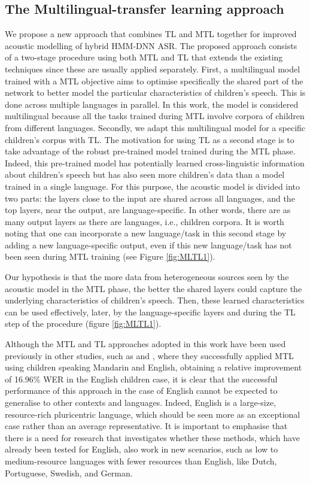 \subsection{The Multilingual-transfer learning approach}
\label{section:method}

We propose a new approach that combines \ac{TL} and \ac{MTL} together for improved acoustic modelling of hybrid \ac{HMM-DNN} \ac{ASR}. The proposed approach consists of a two-stage procedure using both \ac{MTL} and \ac{TL} that extends the existing techniques since these are usually applied separately. First, a multilingual model trained with a \ac{MTL} objective aims to optimise specifically the shared part of the network to better model the particular characteristics of children's speech. This is done across multiple languages in parallel. In this work, the model is considered multilingual because all the tasks trained during \ac{MTL} involve corpora of children from different languages.
Secondly, we adapt this multilingual model for a specific children's corpus with \ac{TL}. The motivation for using \ac{TL} as a second stage is to take advantage of the robust pre-trained model trained during the \ac{MTL} phase. Indeed, this pre-trained model has potentially learned cross-linguistic information about children's speech but has also seen more children's data than a model trained in a single language. 
For this purpose, the acoustic model is divided into two parts: the layers close to the input are shared across all languages, and the top layers, near the output, are language-specific. In other words, there are as many output layers as there are languages, i.e., children corpora. It is worth noting that one can incorporate a new language/task in this second stage by adding a new language-specific output, even if this new language/task has not been seen during \ac{MTL} training (see Figure \ref{fig:MLTL1}).

Our hypothesis is that the more data from heterogeneous sources seen by the acoustic model in the \ac{MTL} phase, the better the shared layers could capture the underlying characteristics of children's speech. Then, these learned characteristics can be used effectively, later, by the language-specific layers and during the \ac{TL} step of the procedure (figure \ref{fig:MLTL1}). 

Although the \ac{MTL} and \ac{TL} approaches adopted in this work have been used previously in other studies, such as \cite{TransferLF} and \cite{2019multi}, where they successfully applied \ac{MTL} using children speaking Mandarin and English, obtaining a relative improvement of 16.96\% \ac{WER} in the English children case, it is clear that the successful performance of this approach in the case of English cannot be expected to generalise to other contexts and languages. Indeed, English is a large-size, resource-rich pluricentric language, which should be seen more as an exceptional case rather than an average representative. It is important to emphasise that there is a need for research that investigates whether these methods, which have already been tested for English, also work in new scenarios, such as low to medium-resource languages with fewer resources than English, like Dutch, Portuguese, Swedish, and German.


